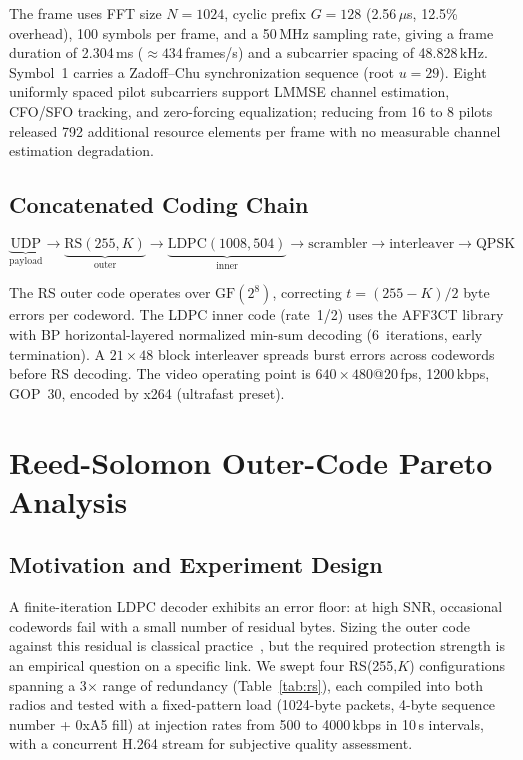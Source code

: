 \documentclass[conference]{IEEEtran}
\begin{document}
The frame uses FFT size $N=1024$, cyclic prefix $G=128$ (2.56\,$\mu$s, 12.5\% overhead), 100 symbols per frame, and a 50\,MHz sampling rate, giving a frame duration of 2.304\,ms ($\approx\!434$\,frames/s) and a subcarrier spacing of 48.828\,kHz. Symbol~1 carries a Zadoff--Chu synchronization sequence (root $u=29$). Eight uniformly spaced pilot subcarriers support LMMSE channel estimation, CFO/SFO tracking, and zero-forcing equalization; reducing from 16 to 8 pilots released 792 additional resource elements per frame with no measurable channel estimation degradation.

\subsection{Concatenated Coding Chain}

\begin{equation*}
\underbrace{\text{UDP}}_{\text{payload}} \to \underbrace{\text{RS}(255,K)}_{\text{outer}} \to \underbrace{\text{LDPC}(1008,504)}_{\text{inner}} \to \text{scrambler} \to \text{interleaver} \to \text{QPSK}
\end{equation*}

The RS outer code operates over $\text{GF}(2^8)$, correcting $t=(255-K)/2$ byte errors per codeword. The LDPC inner code (rate~1/2) uses the AFF3CT library~\cite{cassagne2019aff3ct} with BP horizontal-layered normalized min-sum decoding (6~iterations, early termination). A $21\times48$ block interleaver spreads burst errors across codewords before RS decoding. The video operating point is $640\times480$@20\,fps, 1200\,kbps, GOP~30, encoded by x264 (ultrafast preset).

\section{Reed-Solomon Outer-Code Pareto Analysis}
\label{sec:rs}

\subsection{Motivation and Experiment Design}

A finite-iteration LDPC decoder exhibits an error floor: at high SNR, occasional codewords fail with a small number of residual bytes. Sizing the outer code against this residual is classical practice~\cite{lin2004ecc}, but the required protection strength is an empirical question on a specific link. We swept four RS(255,$K$) configurations spanning a 3$\times$ range of redundancy (Table~\ref{tab:rs}), each compiled into both radios and tested with a fixed-pattern load (1024-byte packets, 4-byte sequence number + 0xA5 fill) at injection rates from 500 to 4000\,kbps in 10\,s intervals, with a concurrent H.264 stream for subjective quality assessment.
\end{document}
